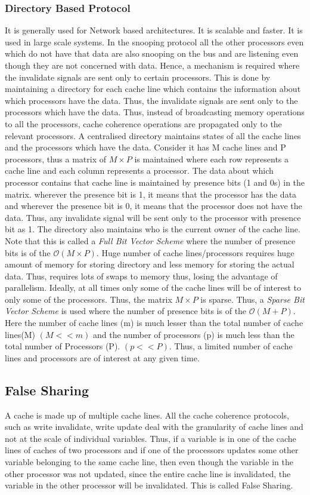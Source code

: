 \documentclass[12pt]{article}
\begin{document}
\subsubsection{Directory Based Protocol}
It is generally used for Network based architectures. It is scalable and faster. It is used in large scale systems.
In the snooping protocol all the other processors even which do not have that data are also snooping on the bus and are listening even though they are not concerned with data.
Hence, a mechanism is required where the invalidate signals are sent only to certain processors. This is done by maintaining a directory for each cache line 
which contains the information about which processors have the data. Thus, the invalidate signals are sent only to the processors which have the data.
Thus, instead of broadcasting memory operations to all the processors, cache coherence operations are propagated only to the relevant processors. 
A centralised directory maintains states of all the cache lines and the processors which have the data.
Consider it has M cache lines and P processors, thus a matrix of $M \times P$ is maintained where each row represents a cache line and each column represents a processor.
The data about which processor contains that cache line is maintained by presence bits (1 and 0s) in the matrix. wherever the presence bit is 1,
it means that the processor has the data and wherever the presence bit is 0, it means that the processor does not have the data.
Thus, any invalidate signal will be sent only to the processor with presence bit as 1. The directory also maintains 
who is the current owner of the cache line. 
Note that this is called a \textit{Full Bit Vector Scheme} where the number of presence bits is of the $\mathcal{O}(M \times P)$.
Huge number of cache lines/processors requires huge amount of memory for storing directory and less memory for storing the actual data. Thus, requires
lots of swaps to memory thus, losing the advantage of parallelism. Ideally, at all times only some of the cache lines will be of interest to only some of the processors. 
Thus, the matrix $M \times P$ is sparse. Thus, a \textit{Sparse Bit Vector Scheme} is used where the number of presence bits is of the $\mathcal{O}(M + P)$.
Here the number of cache lines (m) is much lesser than the total number of cache lines(M) $(M<<m)$ and the number of processors (p) is much less than the
total number of Processors (P). $(p<<P)$. Thus, a limited number of cache lines and processors are of interest at any given time.

\subsection{False Sharing}
A cache is made up of multiple cache lines. All the cache coherence protocols, such as write invalidate, write update deal with the granularity of cache lines and not at the scale of individual variables.
Thus, if a variable is in one of the cache lines of caches of two processors and if one of the processors updates some other variable belonging to the same cache line, then even though 
the variable in the other processor was not updated, since the entire cache line is invalidated, the variable in the other processor will be invalidated. This is called False Sharing.
\end{document}
